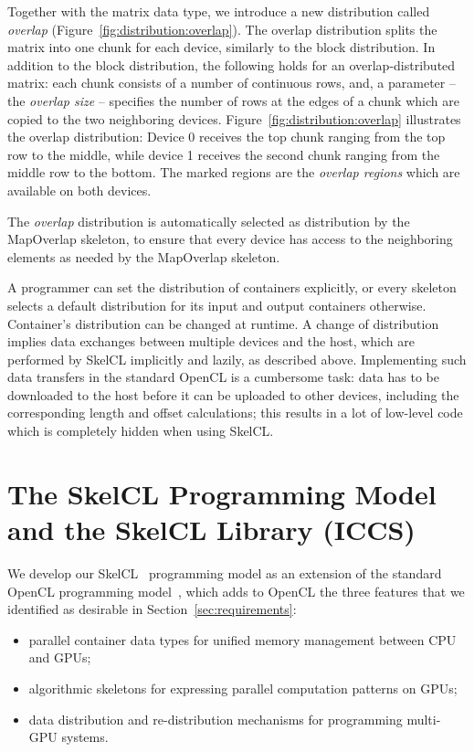 Together with the matrix data type, we introduce a new distribution called \emph{overlap} (Figure~\ref{fig:distribution:overlap}).
The overlap distribution splits the matrix into one chunk for each device, similarly to the block distribution.
In addition to the block distribution, the following holds for an overlap-distributed matrix:
each chunk consists of a number of continuous rows, and, a parameter -- the \emph{overlap size} -- specifies the number of rows at the edges of a chunk which are copied to the two neighboring devices.
Figure~\ref{fig:distribution:overlap} illustrates the overlap distribution:
Device 0 receives the top chunk ranging from the top row to the middle, while device 1 receives the second chunk ranging from the middle row to the bottom.
The marked regions are the \emph{overlap regions} which are available on both devices.

The \emph{overlap} distribution is automatically selected as distribution by the MapOverlap skeleton, to ensure that every device has access to the neighboring elements as needed by the MapOverlap skeleton.

A programmer can set the distribution of containers explicitly, or every skeleton selects a default distribution for its input and output containers otherwise.
Container's distribution can be changed at runtime.
A change of distribution implies data exchanges between multiple devices and the host, which are performed by SkelCL implicitly and lazily, as described above.
Implementing such data transfers in the standard OpenCL is a cumbersome task:
data has to be downloaded to the host before it can be uploaded to other devices, including the corresponding length and offset calculations;
this results in a lot of low-level code which is completely hidden when using SkelCL.




\section{The SkelCL Programming Model and the SkelCL Library (ICCS)}

We develop our SkelCL~\cite{StKG-11} programming model as an extension of the standard OpenCL programming model~\cite{OpenCL-10}, which adds to OpenCL the three features that we identified as desirable in Section~\ref{sec:requirements}:
\begin{itemize}
  \item parallel container data types for unified memory management between CPU and GPUs;
  \item algorithmic skeletons for expressing parallel computation patterns on GPUs;
  \item data distribution and re-distribution mechanisms for programming multi-GPU systems.
\end{itemize}

